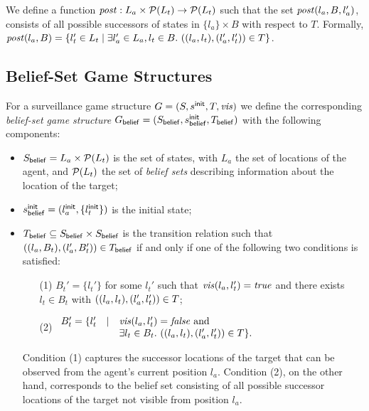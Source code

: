 We define a function $\mathit{post} : L_a \times \mathcal{P}(L_t) \to \mathcal{P}(L_t)$ such that the set $\mathit{post}(l_a,B,l_a')$, consists of all possible successors of states in $\{l_a\} \times B$ with respect to $T$. Formally, $\mathit{post}(l_a, B) = \{l_t' \in L_t \mid \exists l_a' \in L_a, l_t \in B.\ ((l_a,l_t),(l_a',l_t')) \in T \}$.

\subsection{Belief-Set Game Structures}

For a surveillance game structure $G  = (S,s^{\mathsf{init}},T,\mathit{vis})$ we define the corresponding \emph{belief-set game structure} $G_{\mathsf{belief}}  = (S_{\mathsf{belief}},s^{\mathsf{init}}_{\mathsf{belief}},T_{\mathsf{belief}})$ with the following components:
\begin{itemize}
\item $S_{\mathsf{belief}} = L_a \times \mathcal{P}(L_t)$ is the set of states, with $L_a$ the set of locations of the agent, and $\mathcal{P}(L_t)$ the set of \emph{belief sets} describing information about the location of the target;
\item $s^{\mathsf{init}}_{\mathsf{belief}} = (l_a^{\mathsf{init}},\{l_t^{\mathsf{init}}\})$ is the initial state;
\item $T_{\mathsf{belief}} \subseteq S_{\mathsf{belief}} \times S_{\mathsf{belief}}$ is the transition relation such that $((l_a, B_t),(l_a', B_t')) \in T_{\mathsf{belief}}$ if and only if one of the following two conditions is satisfied:
\begin{itemize}
\item[(1)] $B_t' = \{l_t'\}$ for some $l_t'$ such that $\mathit{vis}(l_a,l_t') = \mathit{true}$ and
there exists $l_t \in B_t$ with $((l_a,l_t),(l_a',l_t')) \in T$;
\item[(2)] $\begin{array}{lll}
B_t' = \{l_t' & \mid & \mathit{vis}(l_a,l_t') = \mathit{false} \text{ and } \\
&& \exists l_t \in B_t.\ ((l_a,l_t),(l_a',l_t')) \in T\}. 
\end{array}
$
\end{itemize}
Condition (1) captures the successor locations of the target that can be observed from the agent's current position $l_a$. Condition (2), on the other hand, corresponds to the belief set consisting of all possible successor locations of the target not visible from position $l_a$. 

\end{itemize}
